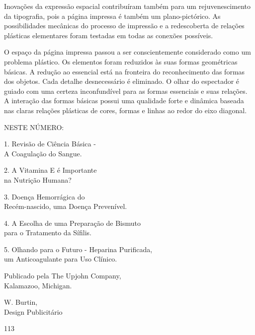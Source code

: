 \documentclass[a4paper]{article}
\begin{document}
Inovações da expressão espacial contribuíram também para um rejuvenescimento da tipografia, pois a página impressa é também um plano-pictórico. As possibilidades mecânicas do processo de impressão e a redescoberta de relações plásticas elementares foram testadas em todas as conexões possíveis.

O espaço da página impressa passou a ser conscientemente considerado como um problema plástico. Os elementos foram reduzidos às suas formas geométricas básicas. A redução ao essencial está na fronteira do reconhecimento das formas dos objetos. Cada detalhe desnecessário é eliminado. O olhar do espectador é guiado com uma certeza inconfundível para as formas essenciais e suas relações. A interação das formas básicas possui uma qualidade forte e dinâmica baseada nas claras relações plásticas de cores, formas e linhas ao redor do eixo diagonal.

\vspace{\baselineskip}

\begin{flushleft}
NESTE NÚMERO:
\par
1. Revisão de Ciência Básica -\\
A Coagulação do Sangue.
\par
2. A Vitamina E é Importante\\
na Nutrição Humana?
\par
3. Doença Hemorrágica do\\
Recém-nascido, uma Doença Prevenível.
\par
4. A Escolha de uma Preparação de Bismuto\\
para o Tratamento da Sífilis.
\par
5. Olhando para o Futuro - Heparina Purificada,\\
um Anticoagulante para Uso Clínico.
\par
\vspace{\baselineskip}
Publicado pela The Upjohn Company,\\
Kalamazoo, Michigan.
\end{flushleft}

\vspace{\baselineskip}

\begin{flushleft}
W. Burtin,\\
Design Publicitário
\end{flushleft}

\vfill

\begin{center}
113
\end{center}
\end{document}
